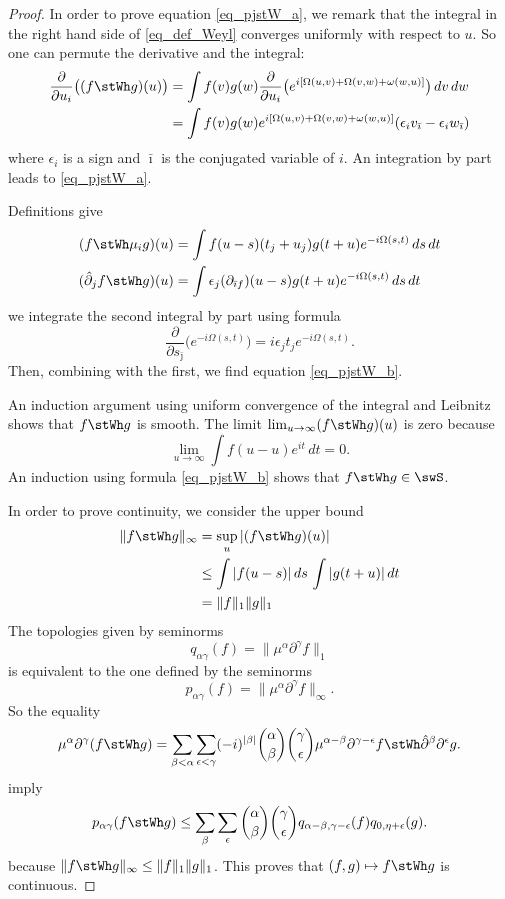 \begin{proof}
In order to prove equation \eqref{eq_pjstW_a}, we remark that the integral in the right hand side of \eqref{eq_def_Weyl} converges uniformly with respect to $u$. So one can permute the derivative and the integral:
\[ 
 \begin{split} 
  \frac{ \partial }{ \partial u_i }\big( (f\stWh g)(u) \big)&=\int f(v)g(w)\frac{ \partial }{ \partial u_i }\big( e^{i[\Omega(u,v)+\Omega(v,w)+\omega(w,u)]} \big)\,dv\,dw\\
		&=\int f(v)g(w)e^{i[\Omega(u,v)+\Omega(v,w)+\omega(w,u)]}(\epsilon_i v_{\bar\imath}-\epsilon_i w_{\bar\imath})
\end{split}
\]
where $\epsilon_i$ is a sign and $\bar\imath$ is the conjugated variable of $i$. An integration by part leads to \eqref{eq_pjstW_a}.  

Definitions give
\begin{subequations}
\begin{align}
  (f\stWh \mu_ig)(u)&=\int f(u-s)(t_j+u_j)g(t+u)e^{-i\Omega(s,t)}\,ds\,dt\\
 (\hat\partial_jf\stWh g)(u)&=\int \epsilon_j(\partial_{\bar\imath f})(u-s)g(t+u)e^{-i\Omega(s,t)}\,ds\,dt
\end{align}
\end{subequations}
we integrate the second integral by part using formula
\[ 
  \frac{ \partial }{ \partial s_{\bar\jmath} }\big( e^{-i\Omega(s,t)} \big)=i\epsilon_jt_je^{-i\Omega(s,t)}.
\]
Then, combining with the first, we find equation \eqref{eq_pjstW_b}.

An induction argument using uniform convergence of the integral and Leibnitz shows that $f\stWh g$ is smooth. The limit $\lim_{u\to\infty}(f\stWh g)(u)$ is zero because
\[ 
  \lim_{u\to\infty}\int f(u-u)e^{it}\,dt=0.
\]
An induction using formula  \eqref{eq_pjstW_b} shows that $f\stWh g\in\swS$.
 
In order to prove continuity, we consider the upper bound
\begin{equation}
\begin{split}
  \| f\stWh g \|_{\infty}&=\sup_u| (f\stWh g)(u) |\\	
		&\leq \int | f(u-s) |\,ds\,\int | g(t+u) |\,dt\\
		&=\| f \|_1\| g \|_1
\end{split}
\end{equation}
The topologies given by seminorms
\[ 
  q_{\alpha\gamma}(f)=\| \mu^{\alpha}\partial^{\gamma}f \|_1
\]
is equivalent to the one defined by the seminorms
\[ 
  p_{\alpha\gamma}(f)=\| \mu^{\alpha}\partial^{\gamma}f \|_{\infty}.
\]
So the equality
\[ 
  \mu^{\alpha}\partial^{\gamma}(f\stWh g)=\sum_{\beta<\alpha}\sum_{\epsilon<\gamma}(-i)^{| \beta |}\binom{\alpha}{\beta}\binom{\gamma}{\epsilon}\mu^{\alpha-\beta}\partial^{\gamma-\epsilon}f\stWh \hat\partial^{\beta}\partial^{\epsilon}g.
\]
imply
\[ 
  p_{\alpha\gamma}(f\stWh g)\leq\sum_{\beta}\sum_{\epsilon} \binom{\alpha}{\beta}\binom{\gamma}{\epsilon}q_{\alpha-\beta,\gamma-\epsilon}(f)q_{0,\eta+\epsilon}(g).
\]
because $\| f\stWh g \|_{\infty}\leq\| f \|_1\| g \|_1$. This proves that $(f,g)\mapsto f\stWh g$ is continuous.


\end{proof}
